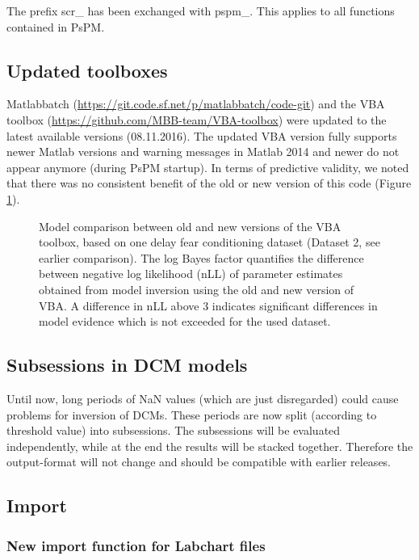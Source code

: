 \documentclass[english]{article}
\numberwithin{equation}{section}
\numberwithin{figure}{section}
\begin{document}
The prefix scr\_ has been exchanged with pspm\_. This applies to all
functions contained in PsPM.

\subsection*{Updated toolboxes}

Matlabbatch (\url{https://git.code.sf.net/p/matlabbatch/code-git})
and the VBA toolbox (\url{https://github.com/MBB-team/VBA-toolbox})
were updated to the latest available versions (08.11.2016). The updated
VBA version fully supports newer Matlab versions and warning messages
in Matlab 2014 and newer do not appear anymore (during PsPM startup).
In terms of predictive validity, we noted that there was no consistent
benefit of the old or new version of this code (Figure \ref{fig:VBA_compare_3.2}).

\begin{figure}

\caption{\label{fig:VBA_compare_3.2}Model comparison between old and new versions
of the VBA toolbox, based on one delay fear conditioning dataset (Dataset
2, see earlier comparison). The log Bayes factor quantifies the difference
between negative log likelihood (nLL) of parameter estimates obtained
from model inversion using the old and new version of VBA. A difference
in nLL above 3 indicates significant differences in model evidence
which is not exceeded for the used dataset.}

\end{figure}


\subsection*{Subsessions in DCM models}

Until now, long periods of NaN values (which are just disregarded)
could cause problems for inversion of DCMs. These periods are now
split (according to threshold value) into subsessions. The subsessions
will be evaluated independently, while at the end the results will
be stacked together. Therefore the output-format will not change and
should be compatible with earlier releases.

\subsection*{Import}

\subsubsection*{New import function for Labchart files}
\end{document}
